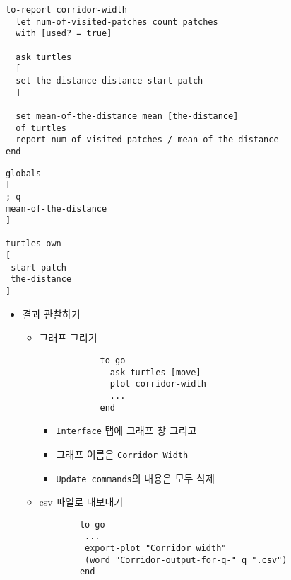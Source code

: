 \documentclass[hyperref={unicode}]{beamer}
\begin{document}
\begin{frame}[fragile]
\begin{verbatim}
to-report corridor-width
  let num-of-visited-patches count patches 
  with [used? = true]
	  
  ask turtles
  [
  set the-distance distance start-patch
  ]
      
  set mean-of-the-distance mean [the-distance] 
  of turtles  
  report num-of-visited-patches / mean-of-the-distance
end
\end{verbatim}
\end{frame}

\begin{frame}[fragile]
\begin{verbatim}
globals
[
; q
mean-of-the-distance
]

turtles-own
[
 start-patch
 the-distance
]
\end{verbatim}	
\end{frame}

\begin{frame}[fragile]
\begin{itemize}
\item 결과 관찰하기
	\begin{itemize}
	\item 그래프 그리기
			\begin{verbatim}
			to go
			  ask turtles [move]
			  plot corridor-width
			  ...
			end
			\end{verbatim}
		\begin{itemize}
		\item \verb|Interface| 탭에 그래프 창 그리고
		\item 그래프 이름은 \verb|Corridor Width|
		\item \verb|Update commands|의 내용은 모두 삭제
		\end{itemize}
	\item csv 파일로 내보내기
		\begin{verbatim}
		to go
		 ...
		 export-plot "Corridor width"
		 (word "Corridor-output-for-q-" q ".csv")	
		end
	\end{verbatim}
	\end{itemize}
\end{itemize}
\end{frame}
\end{document}
